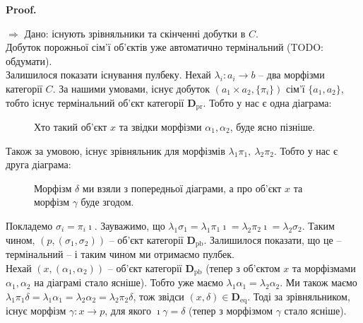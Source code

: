 \documentclass[a4paper, 10pt]{article}
\makeatletter
\def\rightproof{$\boxed{\Rightarrow}$ }
\theoremstyle{theoremdd}
\renewenvironment{proof}[1][Proof.\\]{\par
\pushQED{\hfill \qed}%
\normalfont \topsep6\p@\@plus6\p@\relax
\trivlist
\item\relax
{\bfseries
#1\@addpunct{.}}\hspace\labelsep\ignorespaces
}{%
\popQED\endtrivlist\@endpefalse
}
\makeatother
\begin{document}
\begin{proof}
\rightproof Дано: існують зрівняльники та скінченні добутки в $C$.\\
Добуток порожньої сім'ї об'єктів уже автоматично термінальний (TODO: обдумати).\\
Залишилося показати існування пулбеку. Нехай $\lambda_i \colon a_i \to b$ -- два морфізми категорії $C$. За нашими умовами, існує добуток $(a_1 \times a_2, \{\pi_i\})$ сім'ї $\{a_1,a_2\}$, тобто існує термінальний об'єкт категорії $\textbf{D}_{\text{pr}}$. Тобто у нас є одна діаграма:
\begin{figure}[H]
\centering
{}
\caption*{Хто такий об'єкт $x$ та звідки морфізми $\alpha_1,\alpha_2$, буде ясно пізніше.}
\end{figure}
\noindent
Також за умовою, існує зрівняльник для морфізмів $\lambda_1 \pi_1,\ \lambda_2 \pi_2$. Тобто у нас є друга діаграма:
\begin{figure}[H]
\centering
{}
\caption*{Морфізм $\delta$ ми взяли з попередньої діаграми, а про об'єкт $x$ та морфізм $\gamma$ буде згодом.}
\end{figure}
\noindent Покладемо $\sigma_i = \pi_i \imath$. Зауважимо, що $\lambda_1 \sigma_1 = \lambda_1 \pi_1 \imath = \lambda_2 \pi_2 \imath = \lambda_2 \sigma_2$. Таким чином, $(p,(\sigma_1,\sigma_2))$ -- об'єкт категорії $\textbf{D}_{\text{pb}}$. Залишилося показати, що це -- термінальний -- і таким чином ми отримаємо пулбек.\\ 
Нехай $(x,(\alpha_1,\alpha_2))$ -- об'єкт категорії $\textbf{D}_{\text{pb}}$ (тепер з об'єктом $x$ та морфізмами $\alpha_1,\alpha_2$ на діаграмі стало ясніше). Тобто уже маємо $\lambda_1 \alpha_1 = \lambda_2 \alpha_2$. Ми також маємо $\lambda_1 \pi_1 \delta = \lambda_1 \alpha_1 = \lambda_2 \alpha_2 = \lambda_2 \pi_2 \delta$, тож звідси $(x,\delta) \in \textbf{D}_{\text{eq}}$. Тоді за зрівняльником, існує морфізм $\gamma \colon x \to p$, для якого $\imath \gamma = \delta$ (тепер з морфізмом $\gamma$ стало ясніше).\\

\end{proof}
\end{document}
